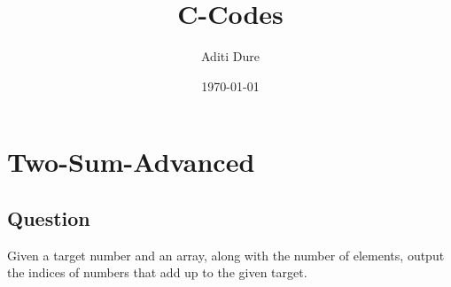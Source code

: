 \documentclass{article}
\begin{document}
\title{C-Codes}
\author{Aditi Dure}
\date{\today}
\maketitle

\section{Two-Sum-Advanced}		

\subsection{Question}
    Given a target number and an array, along with the number of elements, output the indices of numbers that add up to the given target.

\end{document}

